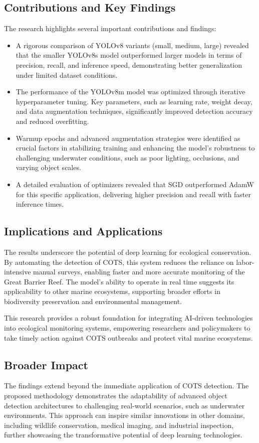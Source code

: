 \documentclass[conference]{IEEEtran}
\begin{document}
\subsection{Contributions and Key Findings}
The research highlights several important contributions and findings:
\begin{itemize}
    \item A rigorous comparison of YOLOv8 variants (small, medium, large) revealed that the smaller YOLOv8s model outperformed larger models in terms of precision, recall, and inference speed, demonstrating better generalization under limited dataset conditions.
    \item The performance of the YOLOv8m model was optimized through iterative hyperparameter tuning. Key parameters, such as learning rate, weight decay, and data augmentation techniques, significantly improved detection accuracy and reduced overfitting.
    \item Warmup epochs and advanced augmentation strategies were identified as crucial factors in stabilizing training and enhancing the model's robustness to challenging underwater conditions, such as poor lighting, occlusions, and varying object scales.
    \item A detailed evaluation of optimizers revealed that SGD outperformed AdamW for this specific application, delivering higher precision and recall with faster inference times.
\end{itemize}

\subsection{Implications and Applications}
The results underscore the potential of deep learning for ecological conservation. By automating the detection of COTS, this system reduces the reliance on labor-intensive manual surveys, enabling faster and more accurate monitoring of the Great Barrier Reef. The model's ability to operate in real time suggests its applicability to other marine ecosystems, supporting broader efforts in biodiversity preservation and environmental management.

This research provides a robust foundation for integrating AI-driven technologies into ecological monitoring systems, empowering researchers and policymakers to take timely action against COTS outbreaks and protect vital marine ecosystems.

\subsection{Broader Impact}
The findings extend beyond the immediate application of COTS detection. The proposed methodology demonstrates the adaptability of advanced object detection architectures to challenging real-world scenarios, such as underwater environments. This approach can inspire similar innovations in other domains, including wildlife conservation, medical imaging, and industrial inspection, further showcasing the transformative potential of deep learning technologies.
\end{document}
